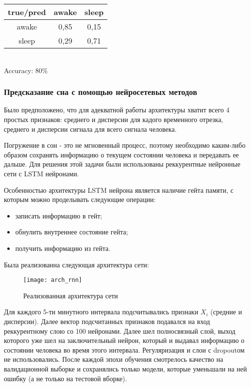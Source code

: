\begin{tabular}{|c|c|c|}
	\hline \rule[-2ex]{0pt}{5.5ex} true/pred & awake & sleep \\ 
	\hline \rule[-2ex]{0pt}{5.5ex} awake & 0,85 & 0,15 \\ 
	\hline \rule[-2ex]{0pt}{5.5ex} sleep & 0,29 & 0,71 \\ 
	\hline 
	
\end{tabular}\\

Accuracy:  80\%

\subsubsection{Предсказание сна с помощью нейросетевых методов}
Было предположено, что для адекватной работы архитектуры хватит всего 4 простых признаков: среднего и дисперсии для кадого временного отрезка, среднего и дисперсии сигнала для всего сигнала человека.

Погружение в сон - это не мгновенный процесс, поэтому необходимо каким-либо образом сохранять информацию о текущем состоянии человека и передавать ее дальше. Для решения этой задачи были использованы реккурентные нейронные сети с LSTM нейронами. 

Особенностью архитектуры LSTM нейрона является наличие гейта памяти, с которым можно проделывать следующие операции:
\begin{itemize}
	\item записать информацию в гейт;
	\item обнулить внутреннее состояние гейта;
	\item получить информацию из гейта.
\end{itemize}

Была реализованна следующая архитектура сети:

\begin{figure}[h]
	\begin{center}
		\texttt{[image: arch\_rnn]}
		\caption{Реализованная архитектура сети}
		\label{ris:arh_rnn}
	\end{center}
\end{figure}

Для каждого 5-ти минутного интервала подсчитывались признаки $X_i$ (средние и дисперсии). Далее вектор подсчитанных признаков подавался на вход реккурентному слою со 100 нейронами. Далее шел полносвязный слой, выход которого уже шел на заключительный нейрон, который и выдавал информацию о состоянии человека во время этого интервала. Регуляризация и слои с dropoutом не использовались. После каждой эпохи обучения смотрелось качество на валидационной выборке и сохранялись только модели, которые уменьшали на ней ошибку (а не только на тестовой вборке). 

